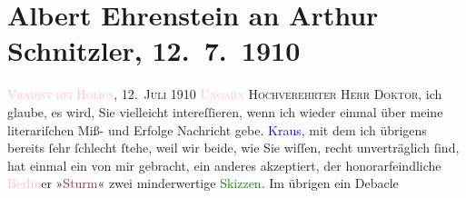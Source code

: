 

               \section[Albert Ehrenstein an Arthur Schnitzler, 12. 7. 1910]{ Albert Ehrenstein an Arthur Schnitzler, 12. 7. 1910}\nopagebreak{}\rehead{ }\normalsize\beginnumbering{} \toendnotes[C]{\smallbreak\pagebreak[2]} 
\toendnotes[C]{\smallbreak}\pstart
           {\pb}\textsc{\textcolor{pink}{Vradist bei Holics}{}\ledrightnote{\textcolor{pink}{Vrádište}}, }\hfill \textsc{12. Juli 1910}\pend
           \pstart
           \textsc{\textcolor{pink}{Ungarn}{}\ledrightnote{\textcolor{pink}{Ungarn}}}\pend
           \pstart{}\textsc{Hochverehrter Herr Doktor,}\pend\pstart
           ich glaube, es wird, Sie vielleicht intereſſieren, wenn ich wieder einmal über
                    meine literariſchen Miß- und Erfolge Nachricht gebe. \textcolor{blue}{Kraus}{}\ledrightnote{\textcolor{blue}{Karl Kraus}}, mit dem ich übrigens bereits ſehr ſchlecht ſtehe,
                    weil wir beide, wie Sie wiſſen, recht unverträglich ſind, hat einmal ein \label{K_L01946_1v}\label{K_L01946_1h} von mir gebracht, ein anderes akzeptiert, der
                    honorarfeindliche \textcolor{pink}{Berlin}{}\ledrightnote{\textcolor{pink}{Berlin}}er »\textcolor{brown}{Sturm}{}\ledrightnote{\textcolor{brown}{Der Sturm}}« zwei minderwertige \textcolor{green}{Skizzen}{}. Im übrigen ein Debacle
